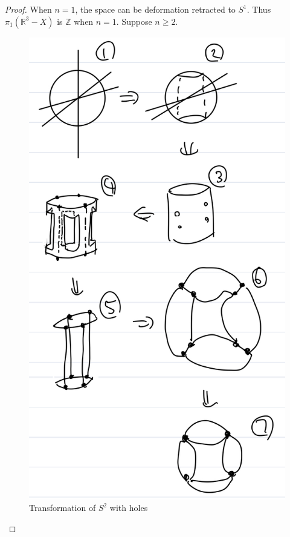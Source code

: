 \documentclass[12pt, psamsfonts]{amsart}
\theoremstyle{definition}
\theoremstyle{remark}
\numberwithin{equation}{section}
\begin{document}
\begin{proof}
  When $n = 1$, the space can be deformation retracted to $S^1$.
  Thus $\pi_1(\mathbb{R}^3 - X)$ is $\mathbb{Z}$ when $n = 1$.
  Suppose $n \geq 2$.

  \begin{figure}
    \includegraphics[width=\linewidth]{sphere_lines.jpeg}
      \caption{Transformation of $S^2$ with holes}
    \label{fig:transformation}
  \end{figure}

\end{proof}
\end{document}
